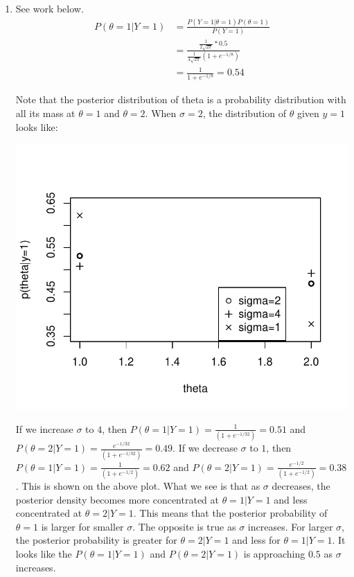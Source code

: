 \documentclass[12pt]{article}\usepackage[]{graphicx}\usepackage[]{color}
\newenvironment{knitrout}{}{} %
\begin{document}
\begin{doublespacing}
\begin{enumerate}
\begin{enumerate}
\begin{center}
\begin{knitrout}
\end{knitrout}
\end{center}

\item See work below.
\begin{align*}
P(\theta=1|Y=1) &= \frac{P(Y=1|\theta=1)P(\theta=1)}{P(Y=1)} \\
&= \frac{\frac{1}{2\sqrt{2\pi}}*0.5}{{\frac{1}{4\sqrt{2\pi}}(1+e^{-1/8})}}\\
&= \frac{1}{1+e^{-1/8}} = 0.54
\end{align*}

Note that the posterior distribution of theta is a probability distribution with all its mass at $\theta=1$ and $\theta=2$. When $\sigma=2$, the distribution of $\theta$ given $y=1$ looks like:

\begin{center}
\begin{knitrout}\footnotesize
{}\color{fgcolor}
\includegraphics[width=0.5\linewidth]{figure/plotdist-1} 

\end{knitrout}
\end{center}

If we increase $\sigma$ to $4$, then $P(\theta=1|Y=1) = \frac{1}{(1+e^{-1/32})}=0.51$ and $P(\theta=2|Y=1) = \frac{e^{-1/32}}{(1+e^{-1/32})}=0.49$. If we decrease $\sigma$ to $1$, then  $P(\theta=1|Y=1) = \frac{1}{(1+e^{-1/2})}=0.62$ and $P(\theta=2|Y=1) = \frac{e^{-1/2}}{(1+e^{-1/2})}=0.38$. This is shown on the above plot. What we see is that as $\sigma$ decreases, the posterior density becomes more concentrated at $\theta=1|Y=1$ and less concentrated at $\theta=2|Y=1$. This means that the posterior probability of $\theta=1$ is larger for smaller $\sigma$. The opposite is true as $\sigma$ increases. For larger $\sigma$, the posterior probability is greater for $\theta=2|Y=1$ and less for $\theta=1|Y=1$. It looks like the $P(\theta=1|Y=1)$ and $P(\theta=2|Y=1)$ is approaching $0.5$ as $\sigma$ increases. 


\end{enumerate}
\end{enumerate}
\end{doublespacing}
\end{document}
